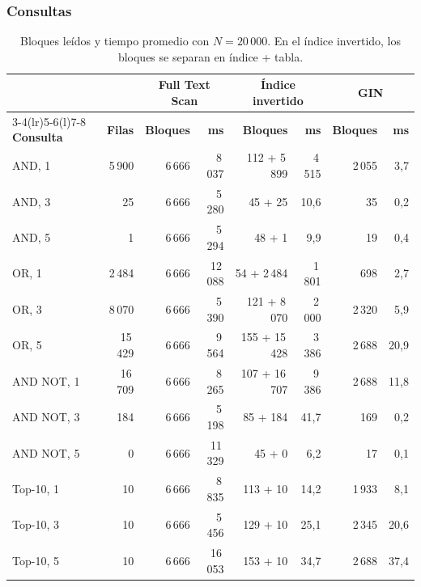 \subsubsection{Consultas}

\begin{table}[H]
\centering
\caption{Bloques leídos y tiempo promedio con $N = 20\,000$. En el índice
invertido, los bloques se separan en índice + tabla.}
\begin{tabular}{@{}lrrrrrrr@{}}
\toprule
& & \multicolumn{2}{c}{\textbf{Full Text Scan}} &
\multicolumn{2}{c}{\textbf{Índice invertido}} &
\multicolumn{2}{c}{\textbf{GIN}} \\
\cmidrule(lr){3-4}\cmidrule(lr){5-6}\cmidrule(l){7-8}
\textbf{Consulta} & \textbf{Filas} & \textbf{Bloques} & \textbf{ms} &
\textbf{Bloques} & \textbf{ms} & \textbf{Bloques} & \textbf{ms} \\
\midrule
AND, 1 & 5\,900 & 6\,666 & 8\,037 & 112 + 5\,899 & 4\,515 & 2\,055 & 3{,}7 \\
AND, 3 & 25 & 6\,666 & 5\,280 & 45 + 25 & 10{,}6 & 35 & 0{,}2 \\
AND, 5 & 1 & 6\,666 & 5\,294 & 48 + 1 & 9{,}9 & 19 & 0{,}4 \\
OR, 1 & 2\,484 & 6\,666 & 12\,088 & 54 + 2\,484 & 1\,801 & 698 & 2{,}7 \\
OR, 3 & 8\,070 & 6\,666 & 5\,390 & 121 + 8\,070 & 2\,000 & 2\,320 & 5{,}9 \\
OR, 5 & 15\,429 & 6\,666 & 9\,564 & 155 + 15\,428 & 3\,386 & 2\,688 & 20{,}9 \\
AND NOT, 1 & 16\,709 & 6\,666 & 8\,265 & 107 + 16\,707 & 9\,386 & 2\,688 & 11{,}8 \\
AND NOT, 3 & 184 & 6\,666 & 5\,198 & 85 + 184 & 41{,}7 & 169 & 0{,}2 \\
AND NOT, 5 & 0 & 6\,666 & 11\,329 & 45 + 0 & 6{,}2 & 17 & 0{,}1 \\
Top-10, 1 & 10 & 6\,666 & 8\,835 & 113 + 10 & 14{,}2 & 1\,933 & 8{,}1 \\
Top-10, 3 & 10 & 6\,666 & 5\,456 & 129 + 10 & 25{,}1 & 2\,345 & 20{,}6 \\
Top-10, 5 & 10 & 6\,666 & 16\,053 & 153 + 10 & 34{,}7 & 2\,688 & 37{,}4 \\
\bottomrule
\end{tabular}
\end{table}

